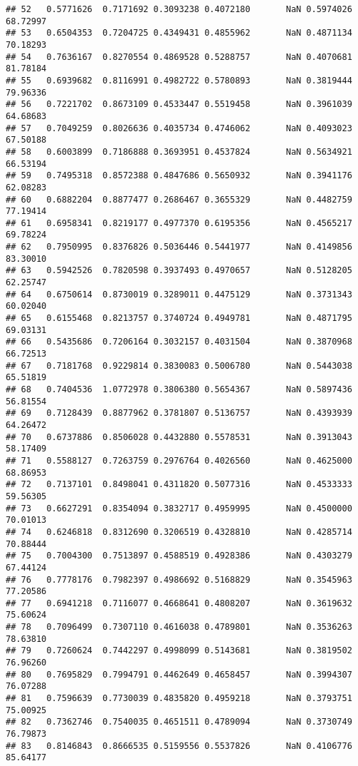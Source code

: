 \documentclass[]{article}
\begin{document}
\begin{verbatim}
## 52   0.5771626  0.7171692 0.3093238 0.4072180       NaN 0.5974026     68.72997
## 53   0.6504353  0.7204725 0.4349431 0.4855962       NaN 0.4871134     70.18293
## 54   0.7636167  0.8270554 0.4869528 0.5288757       NaN 0.4070681     81.78184
## 55   0.6939682  0.8116991 0.4982722 0.5780893       NaN 0.3819444     79.96336
## 56   0.7221702  0.8673109 0.4533447 0.5519458       NaN 0.3961039     64.68683
## 57   0.7049259  0.8026636 0.4035734 0.4746062       NaN 0.4093023     67.50188
## 58   0.6003899  0.7186888 0.3693951 0.4537824       NaN 0.5634921     66.53194
## 59   0.7495318  0.8572388 0.4847686 0.5650932       NaN 0.3941176     62.08283
## 60   0.6882204  0.8877477 0.2686467 0.3655329       NaN 0.4482759     77.19414
## 61   0.6958341  0.8219177 0.4977370 0.6195356       NaN 0.4565217     69.78224
## 62   0.7950995  0.8376826 0.5036446 0.5441977       NaN 0.4149856     83.30010
## 63   0.5942526  0.7820598 0.3937493 0.4970657       NaN 0.5128205     62.25747
## 64   0.6750614  0.8730019 0.3289011 0.4475129       NaN 0.3731343     60.02040
## 65   0.6155468  0.8213757 0.3740724 0.4949781       NaN 0.4871795     69.03131
## 66   0.5435686  0.7206164 0.3032157 0.4031504       NaN 0.3870968     66.72513
## 67   0.7181768  0.9229814 0.3830083 0.5006780       NaN 0.5443038     65.51819
## 68   0.7404536  1.0772978 0.3806380 0.5654367       NaN 0.5897436     56.81554
## 69   0.7128439  0.8877962 0.3781807 0.5136757       NaN 0.4393939     64.26472
## 70   0.6737886  0.8506028 0.4432880 0.5578531       NaN 0.3913043     58.17409
## 71   0.5588127  0.7263759 0.2976764 0.4026560       NaN 0.4625000     68.86953
## 72   0.7137101  0.8498041 0.4311820 0.5077316       NaN 0.4533333     59.56305
## 73   0.6627291  0.8354094 0.3832717 0.4959995       NaN 0.4500000     70.01013
## 74   0.6246818  0.8312690 0.3206519 0.4328810       NaN 0.4285714     70.88444
## 75   0.7004300  0.7513897 0.4588519 0.4928386       NaN 0.4303279     67.44124
## 76   0.7778176  0.7982397 0.4986692 0.5168829       NaN 0.3545963     77.20586
## 77   0.6941218  0.7116077 0.4668641 0.4808207       NaN 0.3619632     75.60624
## 78   0.7096499  0.7307110 0.4616038 0.4789801       NaN 0.3536263     78.63810
## 79   0.7260624  0.7442297 0.4998099 0.5143681       NaN 0.3819502     76.96260
## 80   0.7695829  0.7994791 0.4462649 0.4658457       NaN 0.3994307     76.07288
## 81   0.7596639  0.7730039 0.4835820 0.4959218       NaN 0.3793751     75.00925
## 82   0.7362746  0.7540035 0.4651511 0.4789094       NaN 0.3730749     76.79873
## 83   0.8146843  0.8666535 0.5159556 0.5537826       NaN 0.4106776     85.64177

\end{verbatim}
\end{document}
